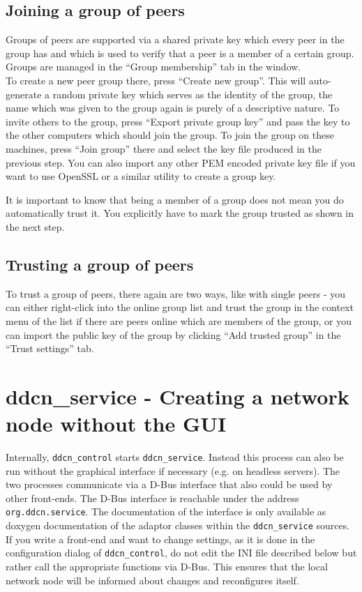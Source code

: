 \documentclass[a4paper,9pt]{scrartcl}
\begin{document}
\subsection{Joining a group of peers}

Groups of peers are supported via a shared private key which every peer in the group has and which is used to verify that a peer is a member of a certain group. \\
Groups are managed in the ``Group membership'' tab in the window. \\
To create a new peer group there, press ``Create new group''. This will auto-generate a random private key which serves as the identity of the group, the name which was given to the group again is purely of a descriptive nature. To invite others to the group, press ``Export private group key'' and pass the key to the other computers which should join the group. To join the group on these machines, press ``Join group'' there and select the key file produced in the previous step. You can also import any other PEM encoded private key file if you want to use OpenSSL or a similar utility to create a group key.\\
\smallskip

It is important to know that being a member of a group does not mean you do automatically trust it. You explicitly have to mark the group trusted as shown in the next step.

\subsection{Trusting a group of peers}

To trust a group of peers, there again are two ways, like with single peers - you can either right-click into the online group list and trust the group in the context menu of the list if there are peers online which are members of the group, or you can import the public key of the group by clicking ``Add trusted group'' in the ``Trust settings'' tab.

\section{ddcn\_service - Creating a network node without the GUI}

Internally, \texttt{ddcn\_control} starts \texttt{ddcn\_service}. Instead this process can also be run without the graphical interface if necessary (e.g. on headless servers). The two processes communicate via a D-Bus interface that also could be used by other front-ends. The D-Bus interface is reachable under the address \texttt{org.ddcn.service}. The documentation of the interface is only available as doxygen documentation of the adaptor classes within the \texttt{ddcn\_service} sources. If you write a front-end and want to change settings, as it is done in the configuration dialog of \texttt{ddcn\_control}, do not edit the INI file described below but rather call the appropriate functions via D-Bus. This ensures that the local network node will be informed about changes and reconfigures itself.
\end{document}
